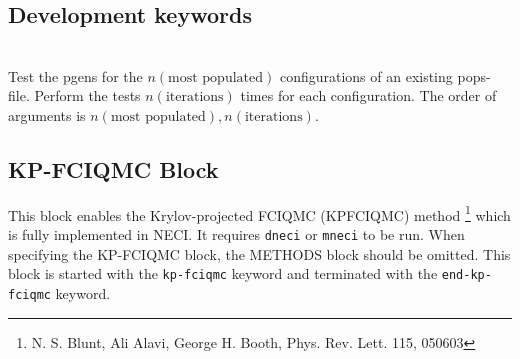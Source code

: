 \documentclass[a4paper,notitlepage,dvipsnames]{scrreprt}
\newcommand{\devcolor}[1]{\textcolor{mgreen}{#1}}
\newcommand\codeitem[1]{\needspace{1.5\baselineskip}\item[\textnormal{\ttfamily #1 \nopagebreak}] \hfill \\ \nopagebreak}
\begin{document}
  \subsection{Development keywords}
  \begin{description}
    \codeitem{\devcolor{UNIT-TEST-PGEN}}
      Test the pgens for the $n(\text{most populated})$ configurations
        of an existing pops-file.
      Perform the tests $n(\text{iterations})$ times for each configuration.
      The order of arguments is $n(\text{most populated}), n(\text{iterations})$.

  \end{description}

  \subsection{KP-FCIQMC Block}
  This block enables the Krylov-projected FCIQMC (KPFCIQMC) method \footnote{N. S. Blunt, Ali
    Alavi, George H. Booth, Phys. Rev. Lett. 115, 050603} which is fully implemented
  in NECI. It requires \texttt{dneci} or \texttt{mneci} to be run. When
  specifying the KP-FCIQMC block, the METHODS block should be omitted. This
  block is started with the \texttt{kp-fciqmc} keyword and terminated with
  the \texttt{end-kp-fciqmc} keyword.
\end{document}
